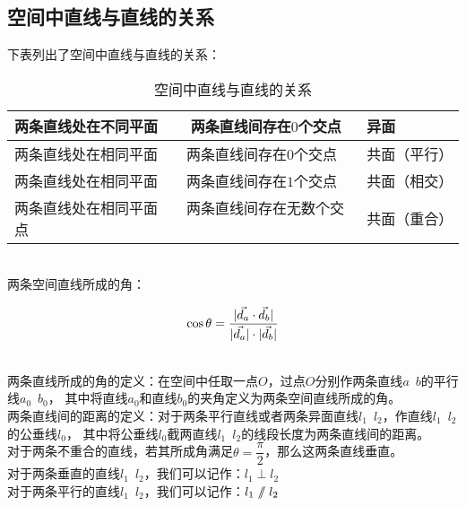 \documentclass[UTF8]{ctexart}
\let\nvec\vec
\def\vec#1{\nvec{\vphantom b\smash{#1}}}
\renewcommand\parallel{{\hspace{3.0pt}\mathrel{/\mskip-6.5mu/}\hspace{2.6pt}}}
\begin{document}
\subsection{空间中直线与直线的关系}
    下表列出了空间中直线与直线的关系：
    \begin{table}[h]
        \begin{center}
            \begin{tabular}{l|l}
                \hline
                两条直线处在不同平面~~~~两条直线间存在$0$个交点&异面\\ \hline
                两条直线处在相同平面~~~~两条直线间存在$0$个交点&共面（平行）\\ \hline
                两条直线处在相同平面~~~~两条直线间存在$1$个交点&共面（相交）\\ \hline
                两条直线处在相同平面~~~~两条直线间存在无数个交点&共面（重合）\\ \hline
            \end{tabular}
            \caption{空间中直线与直线的关系}
        \end{center}
    \end{table}\\
    两条空间直线所成的角：
    \begin{large}
        \begin{equation*}
            \cos{\theta}=\frac{|\vec{d_a}\cdot\vec{d_b}|}{|\vec{d_a}|\cdot|\vec{d_b}|}
        \end{equation*}
    \end{large}\\
    两条直线所成的角的定义：在空间中任取一点$O$，过点$O$分别作两条直线$a$~$b$的平行线$a_{0}$~$b_{0}$，
    其中将直线$a_{0}$和直线$b_{0}$的夹角定义为两条空间直线所成的角。\\[3mm]
    两条直线间的距离的定义：对于两条平行直线或者两条异面直线$l_1$~$l_2$，作直线$l_1$~$l_2$的公垂线$l_0$，
    其中将公垂线$l_0$截两直线$l_1$~$l_2$的线段长度为两条直线间的距离。\\[5mm]
    对于两条不重合的直线，若其所成角满足$\theta=\dfrac{\pi}{2}$，那么这两条直线垂直。\\[3mm]
    对于两条垂直的直线$l_1$~$l_2$，我们可以记作：$l_1\perp l_2$\\[3mm]
    对于两条平行的直线$l_1$~$l_2$，我们可以记作：$l_1\parallel l_2$
\end{document}
